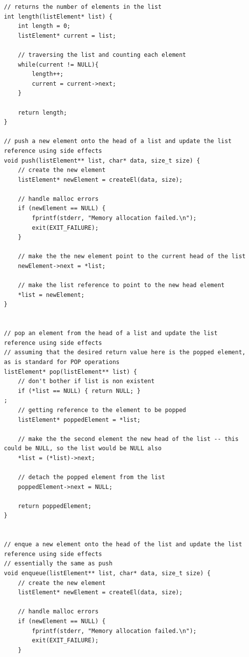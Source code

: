 \documentclass[a4paper]{article}
\newenvironment{code}{\captionsetup{type=listing, skip=0pt}}{}
\begin{document}
\begin{code}
\begin{verbatim}
// returns the number of elements in the list
int length(listElement* list) {
    int length = 0;
    listElement* current = list;

    // traversing the list and counting each element
    while(current != NULL){
        length++;
        current = current->next;
    }

    return length;
}

// push a new element onto the head of a list and update the list reference using side effects
void push(listElement** list, char* data, size_t size) {
    // create the new element
    listElement* newElement = createEl(data, size);

    // handle malloc errors
    if (newElement == NULL) {
        fprintf(stderr, "Memory allocation failed.\n");
        exit(EXIT_FAILURE);
    }

    // make the the new element point to the current head of the list
    newElement->next = *list;

    // make the list reference to point to the new head element 
    *list = newElement;
}


// pop an element from the head of a list and update the list reference using side effects
// assuming that the desired return value here is the popped element, as is standard for POP operations
listElement* pop(listElement** list) {
    // don't bother if list is non existent
    if (*list == NULL) { return NULL; }
;  
    // getting reference to the element to be popped
    listElement* poppedElement = *list;

    // make the the second element the new head of the list -- this could be NULL, so the list would be NULL also
    *list = (*list)->next;

    // detach the popped element from the list
    poppedElement->next = NULL;

    return poppedElement;
}


// enque a new element onto the head of the list and update the list reference using side effects
// essentially the same as push
void enqueue(listElement** list, char* data, size_t size) {
    // create the new element
    listElement* newElement = createEl(data, size);

    // handle malloc errors
    if (newElement == NULL) {
        fprintf(stderr, "Memory allocation failed.\n");
        exit(EXIT_FAILURE);
    }


\end{verbatim}
\end{code}
\end{document}
